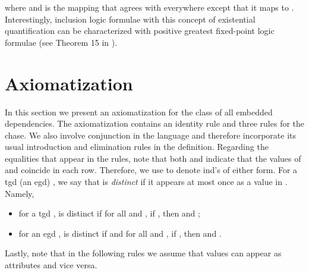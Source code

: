 \documentclass[envcountset]{llncs}
\begin{document}
where  and  is the mapping that agrees with  everywhere except that it maps  to . Interestingly, inclusion logic formulae with this concept of existential quantification can be characterized with positive greatest fixed-point logic formulae (see Theorem 15 in \cite{gallhella13}).











\section{Axiomatization}\label{axiomatization}
In this section we present an axiomatization for the class of all embedded dependencies. The axiomatization contains an identity rule and three rules for the chase. We also involve conjunction in the language and therefore incorporate its usual introduction and elimination rules in the definition.  
Regarding the equalities that appear in the rules, note that both  and   indicate that the values of  and  coincide in each row. Therefore, we use  to denote ind's of either form. For a tgd (an egd) , we say that  is \emph{distinct} if it appears at most once as a value in . Namely, 
\begin{itemize}
\item for a tgd ,  is distinct if for all  and , if , then  and ;
\item for an egd ,  is distinct if  and for all  and , if , then  and .

\end{itemize}
Lastly, note that in the following  rules we  assume that values can appear as attributes and vice versa.
\end{document}
